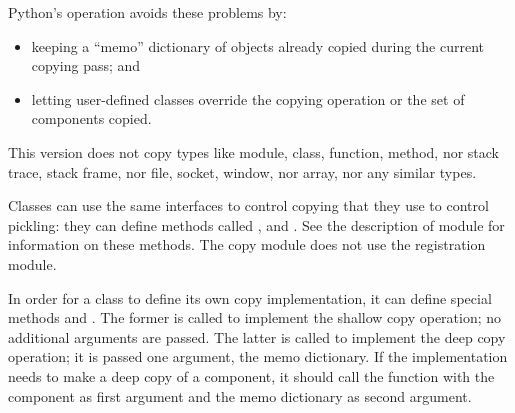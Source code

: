 Python's  operation avoids these problems by:

\begin{itemize}

\item
keeping a ``memo'' dictionary of objects already copied during the current
copying pass; and

\item
letting user-defined classes override the copying operation or the
set of components copied.

\end{itemize}

This version does not copy types like module, class, function, method,
nor stack trace, stack frame, nor file, socket, window, nor array, nor
any similar types.

Classes can use the same interfaces to control copying that they use
to control pickling: they can define methods called
,  and
.  See the description of module 
for information on these methods.
The copy module does not use the  registration
module.

In order for a class to define its own copy implementation, it can
define special methods  and
.  The former is called to
implement the shallow copy operation; no additional arguments are
passed.  The latter is called to implement the deep copy operation; it
is passed one argument, the memo dictionary.  If the
 implementation needs to make a deep copy of a
component, it should call the  function with the
component as first argument and the memo dictionary as second
argument.
